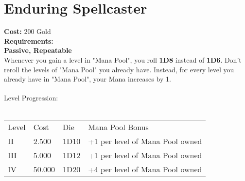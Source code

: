 \section*{Enduring Spellcaster}\label{sec:enduringspellcaster}
\textbf{Cost:} 200 Gold\\
\textbf{Requirements:} -\\
\textbf{Passive, Repeatable}\\
Whenever you gain a level in "Mana Pool", you roll \textbf{1D8} instead of \textbf{1D6}.
Don't reroll the levels of "Mana Pool" you already have.
Instead, for every level you already have in "Mana Pool", your Mana increases by 1.\\
\\
Level Progression:\\
\\
\begin{tabular}{l | l | l | l}
    Level & Cost & Die & Mana Pool Bonus\\
    II & 2.500 & 1D10 & +1 per level of Mana Pool owned\\
    III & 5.000 & 1D12 & +1 per level of Mana Pool owned\\
    IV & 50.000 & 1D20 & +4 per level of Mana Pool owned\\
\end{tabular}